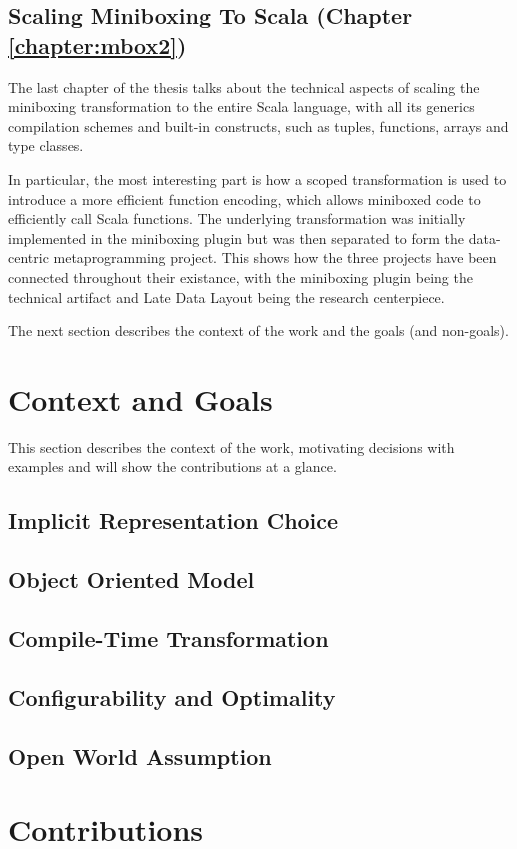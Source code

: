 \subsection{Scaling Miniboxing To Scala (Chapter \ref{chapter:mbox2})}

The last chapter of the thesis talks about the technical aspects of scaling the miniboxing transformation to the entire Scala language, with all its generics compilation schemes and built-in constructs, such as tuples, functions, arrays and type classes.

In particular, the most interesting part is how a scoped transformation is used to introduce a more efficient function encoding, which allows miniboxed code to efficiently call Scala functions. The underlying transformation was initially implemented in the miniboxing plugin but was then separated to form the data-centric metaprogramming project. This shows how the three projects have been connected throughout their existance, with the miniboxing plugin being the technical artifact and Late Data Layout being the research centerpiece.

The next section describes the context of the work and the goals (and non-goals).

\section{Context and Goals}

This section describes the context of the work, motivating decisions with examples and will show the contributions at a glance.

\subsection{Implicit Representation Choice}


\subsection{Object Oriented Model}





\subsection{Compile-Time Transformation}

\subsection{Configurability and Optimality}

\subsection{Open World Assumption}


\section{Contributions}
